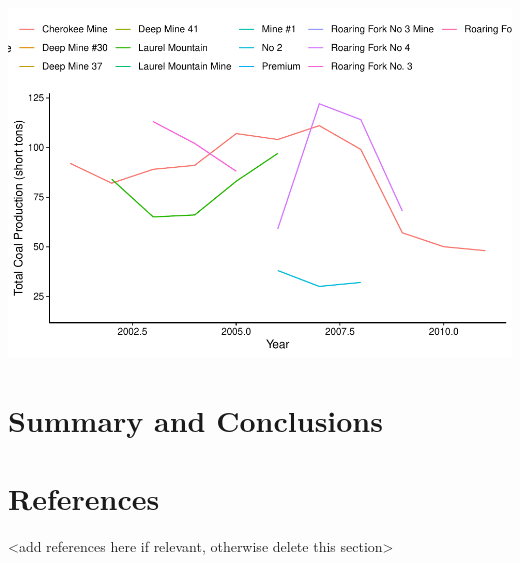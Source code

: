\documentclass[12pt,]{article}
\begin{document}
\includegraphics{Smith_ENV872_Project_files/figure-latex/unnamed-chunk-12-1.pdf}

\newpage

\hypertarget{summary-and-conclusions}{%
\section{Summary and Conclusions}\label{summary-and-conclusions}}

\newpage

\hypertarget{references}{%
\section{References}\label{references}}

\textless{}add references here if relevant, otherwise delete this
section\textgreater{}
\end{document}
